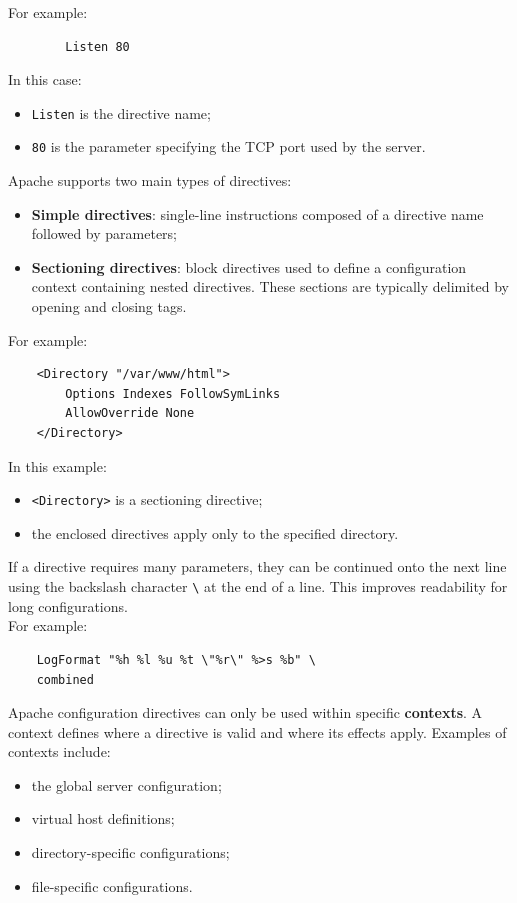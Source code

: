 \documentclass{scrbook}
\begin{document}
	For example:
	\begin{lstlisting}
		Listen 80
	\end{lstlisting}
	
	In this case:
	\begin{itemize}
		\item \texttt{Listen} is the directive name;
		\item \texttt{80} is the parameter specifying the TCP port used by the server.
	\end{itemize}
	
	Apache supports two main types of directives:
	\begin{itemize}
		\item \textbf{Simple directives}: single-line instructions composed of a directive name followed by parameters;
		
		\item \textbf{Sectioning directives}: block directives used to define a configuration context containing nested directives. These sections are typically delimited by opening and closing tags.
	\end{itemize}
	
	For example:
	\begin{lstlisting}
	<Directory "/var/www/html">
		Options Indexes FollowSymLinks
		AllowOverride None
	</Directory>
	\end{lstlisting}
	
	In this example:
	\begin{itemize}
		\item \texttt{<Directory>} is a sectioning directive;
		\item the enclosed directives apply only to the specified directory.
	\end{itemize}
	
	If a directive requires many parameters, they can be continued onto the next line using the backslash character \texttt{\textbackslash} at the end of a line. This improves readability for long configurations.\\
	
	For example:
	\begin{lstlisting}
	LogFormat "%h %l %u %t \"%r\" %>s %b" \
	combined
	\end{lstlisting}
	
	Apache configuration directives can only be used within specific \textbf{contexts}. A context defines where a directive is valid and where its effects apply. Examples of contexts include:
	\begin{itemize}
		\item the global server configuration;
		\item virtual host definitions;
		\item directory-specific configurations;
		\item file-specific configurations.
	\end{itemize}
	
\end{document}
